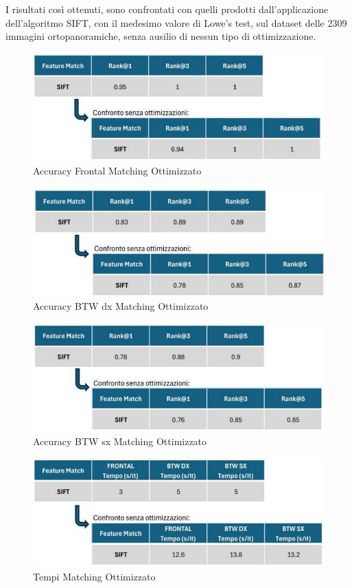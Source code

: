 \documentclass[12pt,a4paper,openright,twoside]{book}
\begin{document}
I risultati così ottenuti, sono confrontati con quelli prodotti dall'applicazione dell'algoritmo SIFT, con il medesimo valore di Lowe's test, sul dataset delle 2309 immagini ortopanoramiche, senza ausilio di nessun tipo di ottimizzazione.
\begin{figure}[H]
	\centering
	\includegraphics{figures/frontal6_1.pdf}
    	\caption{Accuracy Frontal Matching Ottimizzato}
	\label{fig:frontalopt}
\end{figure}
\begin{figure}[H]
	\centering
	\includegraphics{figures/dx6_1.pdf}
    	\caption{Accuracy BTW dx Matching Ottimizzato}
	\label{fig:dxopt}
\end{figure}\begin{figure}[H]
	\centering
	\includegraphics{figures/sx10_1.pdf}
    	\caption{Accuracy BTW sx Matching Ottimizzato}
	\label{fig:sxopt}
\end{figure}
\begin{figure}[H]
	\centering
	\includegraphics{figures/tempi6_1.pdf}
    	\caption{Tempi Matching Ottimizzato}
	\label{fig:tempiopt}
\end{figure}
\end{document}
